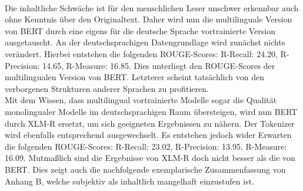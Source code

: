 \noindent{}\\

\noindent
Die inhaltliche Schwäche ist für den menschlichen Leser unschwer erkennbar auch ohne Kenntnis über den Originaltext. Daher wird nun die multilinguale Version von \ac{BERT} durch eine eigens für die deutsche Sprache vortrainierte Version ausgetauscht. An der deutschsprachigen Datengrundlage wird zunächst nichts verändert. Hierbei entstehen die folgenden \ac{ROUGE}-Scores: R-Recall: 24.20, R-Precision: 14.65, R-Measure: 16.85. Dies unterliegt den \ac{ROUGE}-Scores der multilingualen Version von \ac{BERT}. Letzterer scheint tatsächlich von den verborgenen Strukturen anderer Sprachen zu profitieren.\\

\noindent
Mit dem Wissen, dass multilingual vortrainierte Modelle sogar die Qualität monolingualer Modelle im deutschsprachigen Raum übersteigen, wird nun \ac{BERT} durch \ac{XLM-R} ersetzt, um sich geeigneten Ergebnissen zu nähern. Der Tokenizer wird ebenfalls entsprechend ausgewechselt. Es entstehen jedoch wider Erwarten die folgenden \ac{ROUGE}-Scores: R-Recall: 23.02, R-Precision: 13.95, R-Measure: 16.09. Mutmaßlich sind die Ergebnisse von \ac{XLM-R} doch nicht besser als die von \ac{BERT}. Dies zeigt auch die nachfolgende exemplarische Zusammenfassung von Anhang B, welche subjektiv als inhaltlich mangelhaft einzustufen ist.\\

\noindent{}\\



